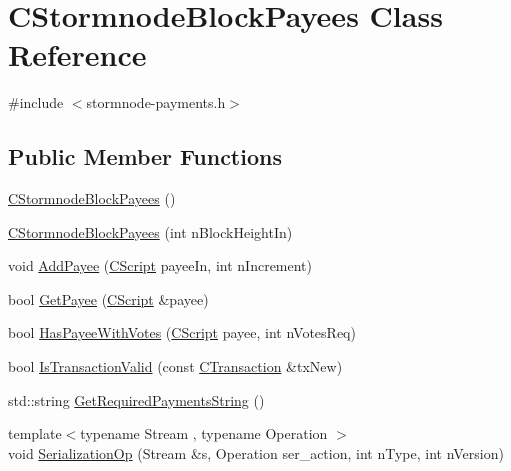 \hypertarget{class_c_stormnode_block_payees}{}\section{C\+Stormnode\+Block\+Payees Class Reference}
\label{class_c_stormnode_block_payees}


{\ttfamily \#include $<$stormnode-\/payments.\+h$>$}

\subsection*{Public Member Functions}
\begin{DoxyCompactItemize}
\item 
\hyperlink{class_c_stormnode_block_payees_abf56459e0d24a7e720c19b2742bd593c}{C\+Stormnode\+Block\+Payees} ()
\item 
\hyperlink{class_c_stormnode_block_payees_a8e88bbdf6ab23389025c1a2316d9de14}{C\+Stormnode\+Block\+Payees} (int n\+Block\+Height\+In)
\item 
void \hyperlink{class_c_stormnode_block_payees_a37d40ae473dee0b5811ba8d8d8f6b039}{Add\+Payee} (\hyperlink{class_c_script}{C\+Script} payee\+In, int n\+Increment)
\item 
bool \hyperlink{class_c_stormnode_block_payees_a26b1c715565e96f35aa3ae3303f1b73a}{Get\+Payee} (\hyperlink{class_c_script}{C\+Script} \&payee)
\item 
bool \hyperlink{class_c_stormnode_block_payees_ae30b0062fffd6c7c8bf0c7553635de25}{Has\+Payee\+With\+Votes} (\hyperlink{class_c_script}{C\+Script} payee, int n\+Votes\+Req)
\item 
bool \hyperlink{class_c_stormnode_block_payees_a83867efab0e90f70384a3c3354ea23d6}{Is\+Transaction\+Valid} (const \hyperlink{class_c_transaction}{C\+Transaction} \&tx\+New)
\item 
std\+::string \hyperlink{class_c_stormnode_block_payees_a63ee6700a4754afd4ccfbd45a46056d3}{Get\+Required\+Payments\+String} ()
\item 
{\footnotesize template$<$typename Stream , typename Operation $>$ }\\void \hyperlink{class_c_stormnode_block_payees_a70e1bc2a9a4dee9c1d00706857009004}{Serialization\+Op} (Stream \&s, Operation ser\+\_\+action, int n\+Type, int n\+Version)
\end{DoxyCompactItemize}
